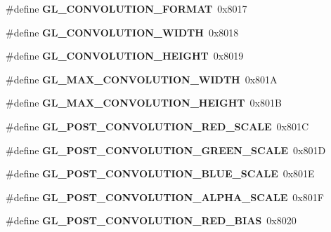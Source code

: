 \begin{DoxyCompactItemize}
\item 
\#define {\bfseries G\+L\+\_\+\+C\+O\+N\+V\+O\+L\+U\+T\+I\+O\+N\+\_\+\+F\+O\+R\+M\+A\+T}~0x8017\label{_s_d_l__opengl_8h_a9c7222b9262e32c7b0cf406277c13f40}

\item 
\#define {\bfseries G\+L\+\_\+\+C\+O\+N\+V\+O\+L\+U\+T\+I\+O\+N\+\_\+\+W\+I\+D\+T\+H}~0x8018\label{_s_d_l__opengl_8h_aa5e1fe3544d20624c29fde754752e537}

\item 
\#define {\bfseries G\+L\+\_\+\+C\+O\+N\+V\+O\+L\+U\+T\+I\+O\+N\+\_\+\+H\+E\+I\+G\+H\+T}~0x8019\label{_s_d_l__opengl_8h_a3eff403f76d44094d4bb7c04156afe46}

\item 
\#define {\bfseries G\+L\+\_\+\+M\+A\+X\+\_\+\+C\+O\+N\+V\+O\+L\+U\+T\+I\+O\+N\+\_\+\+W\+I\+D\+T\+H}~0x801\+A\label{_s_d_l__opengl_8h_a3a8d919f43fc44308410859905737c2a}

\item 
\#define {\bfseries G\+L\+\_\+\+M\+A\+X\+\_\+\+C\+O\+N\+V\+O\+L\+U\+T\+I\+O\+N\+\_\+\+H\+E\+I\+G\+H\+T}~0x801\+B\label{_s_d_l__opengl_8h_a02c69b382a20810d5c3c8f036004cb8f}

\item 
\#define {\bfseries G\+L\+\_\+\+P\+O\+S\+T\+\_\+\+C\+O\+N\+V\+O\+L\+U\+T\+I\+O\+N\+\_\+\+R\+E\+D\+\_\+\+S\+C\+A\+L\+E}~0x801\+C\label{_s_d_l__opengl_8h_a7619915fb0608f760b086a983e6f1aee}

\item 
\#define {\bfseries G\+L\+\_\+\+P\+O\+S\+T\+\_\+\+C\+O\+N\+V\+O\+L\+U\+T\+I\+O\+N\+\_\+\+G\+R\+E\+E\+N\+\_\+\+S\+C\+A\+L\+E}~0x801\+D\label{_s_d_l__opengl_8h_a73d4a426cf831646db38f250cef87cc4}

\item 
\#define {\bfseries G\+L\+\_\+\+P\+O\+S\+T\+\_\+\+C\+O\+N\+V\+O\+L\+U\+T\+I\+O\+N\+\_\+\+B\+L\+U\+E\+\_\+\+S\+C\+A\+L\+E}~0x801\+E\label{_s_d_l__opengl_8h_ae48a6625f550f29d43691a2b95235e59}

\item 
\#define {\bfseries G\+L\+\_\+\+P\+O\+S\+T\+\_\+\+C\+O\+N\+V\+O\+L\+U\+T\+I\+O\+N\+\_\+\+A\+L\+P\+H\+A\+\_\+\+S\+C\+A\+L\+E}~0x801\+F\label{_s_d_l__opengl_8h_a0ec276b53dbfbba4912300766c98764d}

\item 
\#define {\bfseries G\+L\+\_\+\+P\+O\+S\+T\+\_\+\+C\+O\+N\+V\+O\+L\+U\+T\+I\+O\+N\+\_\+\+R\+E\+D\+\_\+\+B\+I\+A\+S}~0x8020\label{_s_d_l__opengl_8h_ad0d0540af972ced1abaa41c3aa50c352}


\end{DoxyCompactItemize}
